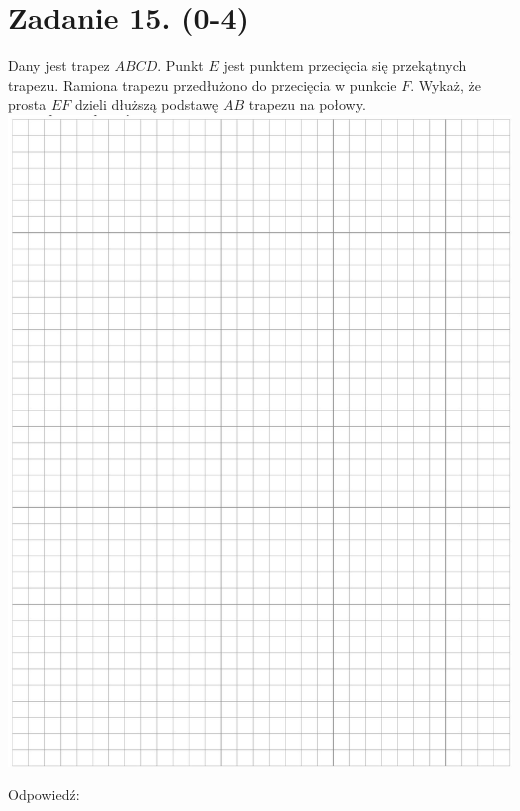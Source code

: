 \documentclass[10pt]{article}
\begin{document}
\section*{Zadanie 15. (0-4)}
Dany jest trapez \(A B C D\). Punkt \(E\) jest punktem przecięcia się przekątnych trapezu. Ramiona trapezu przedłużono do przecięcia w punkcie \(F\). Wykaż, że prosta \(E F\) dzieli dłuższą podstawę \(A B\) trapezu na połowy.\\
\includegraphics[max width=\textwidth, center]{2024_11_21_c0ca116654784d42326bg-12}

Odpowiedź:
\end{document}
